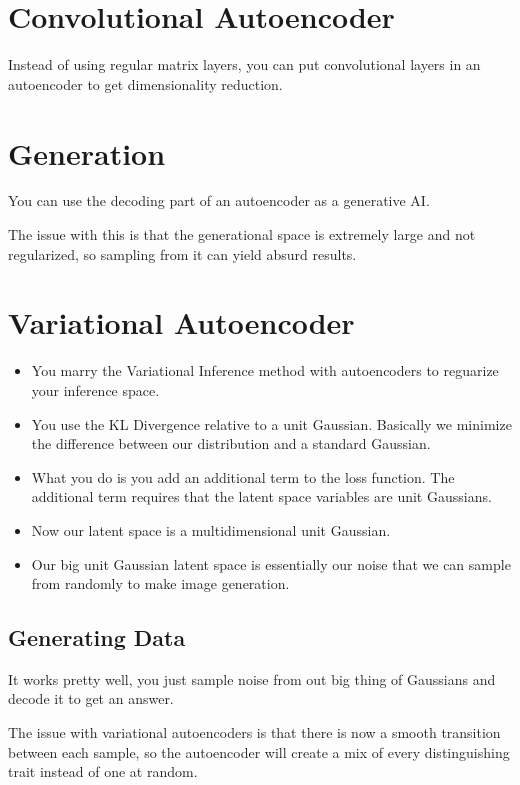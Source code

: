 \documentclass[fleqn]{report}
\begin{document}
\section{Convolutional Autoencoder}
Instead of using regular matrix layers, you can put convolutional layers 
in an autoencoder to get dimensionality reduction. 

\section{Generation}
You can use the decoding part of an autoencoder as a generative AI. 

The issue with this is that the generational space is extremely large 
and not regularized, so sampling from it can yield absurd results. 

\section{Variational Autoencoder}
\begin{itemize}
    \item 
    You marry the Variational Inference method with autoencoders to reguarize 
    your inference space. 
    \item
    You use the KL Divergence relative to a unit Gaussian. 
    Basically we minimize the difference between our distribution and 
    a standard Gaussian. 
    \item
    What you do is you add an additional term to the loss function. 
    The additional term requires that the latent space variables are unit Gaussians. 
    \item
    Now our latent space is a multidimensional unit Gaussian. 
    \item
    Our big unit Gaussian latent space is essentially our noise that we can 
    sample from randomly to make image generation. 
\end{itemize}

\subsection{Generating Data}
It works pretty well, you just sample noise from out big thing of 
Gaussians and decode it to get an answer. 

The issue with variational autoencoders is that there is now a smooth 
transition between each sample, so the autoencoder will create a mix 
of every distinguishing trait instead of one at random. 
\end{document}
